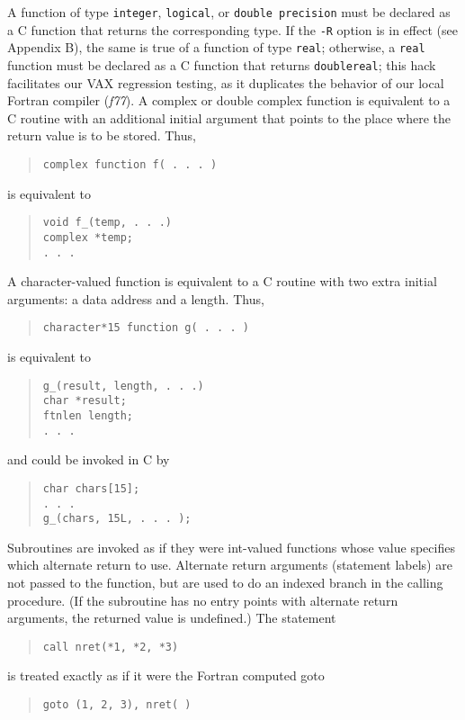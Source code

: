 \documentclass[12pt]{article}
\begin{document}
A function of type \verb|integer|, \verb|logical|, or \verb|double precision| must be declared as a C function that returns the corresponding type. If the \verb|-R| option is in effect (see Appendix B), the same is true of a function of type \verb|real|; otherwise, a \verb|real| function must be declared as a C function that returns \verb|doublereal|; this hack facilitates our VAX regression testing, as it duplicates the behavior of our local Fortran compiler (\emph{f77}). A complex or double complex function is equivalent to a C routine with an additional initial argument that points to the place where the return value is to be stored. Thus,
\begin{quote}
\begin{verbatim}
complex function f( . . . )
\end{verbatim}
\end{quote}
is equivalent to
\begin{quote}
\begin{verbatim}
void f_(temp, . . .)
complex *temp;
. . .
\end{verbatim}
\end{quote}
A character-valued function is equivalent to a C routine with two extra initial arguments: a data address and a length. Thus,
\begin{quote}
\begin{verbatim}
character*15 function g( . . . )
\end{verbatim}
\end{quote}
is equivalent to
\begin{quote}
\begin{verbatim}
g_(result, length, . . .)
char *result;
ftnlen length;
. . .
\end{verbatim}
\end{quote}
and could be invoked in C by
\begin{quote}
\begin{verbatim}
char chars[15];
. . .
g_(chars, 15L, . . . );
\end{verbatim}
\end{quote}
Subroutines are invoked as if they were int-valued functions whose value specifies which alternate return to use. Alternate return arguments (statement labels) are not passed to the function, but are used to do an indexed branch in the calling procedure. (If the subroutine has no entry points with alternate return arguments, the returned value is undefined.) The statement
\begin{quote}
\begin{verbatim}
call nret(*1, *2, *3)
\end{verbatim}
\end{quote}
is treated exactly as if it were the Fortran computed goto
\begin{quote}
\begin{verbatim}
goto (1, 2, 3), nret( )
\end{verbatim}
\end{quote}
\end{document}
